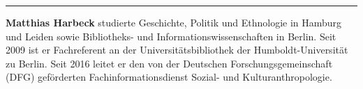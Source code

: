 \begin{center}\rule{0.5\linewidth}{0.5pt}\end{center}

\textbf{Matthias Harbeck} studierte Geschichte, Politik und Ethnologie
in Hamburg und Leiden sowie Bibliotheks- und Informationswissenschaften
in Berlin. Seit 2009 ist er Fachreferent an der Universitätsbibliothek
der Humboldt-Universität zu Berlin. Seit 2016 leitet er den von der
Deutschen Forschungsgemeinschaft (DFG) geförderten
Fachinformationsdienst Sozial- und Kulturanthropologie.
